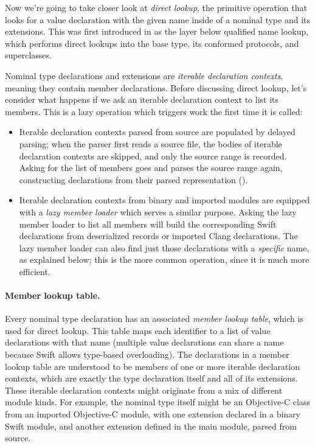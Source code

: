 \documentclass[../generics]{subfiles}
\begin{document}
Now we're going to take closer look at \emph{direct lookup}, the primitive operation that looks for a value declaration with the given name inside of a nominal type and its extensions. This was first introduced in  as the layer below qualified name lookup, which performs direct lookups into the base type, its conformed protocols, and superclasses.

Nominal type declarations and extensions are \emph{iterable declaration contexts}, meaning they contain member declarations. Before discussing direct lookup, let's consider what happens if we ask an iterable declaration context to list its members. This is a lazy operation which triggers work the first time it is called:
\begin{itemize}
\item Iterable declaration contexts parsed from source are populated by delayed parsing; when the parser first reads a source file, the bodies of iterable declaration contexts are skipped, and only the source range is recorded. Asking for the list of members goes and parses the source range again, constructing declarations from their parsed representation ().
\item Iterable declaration contexts from binary and imported modules are equipped with a \emph{lazy member loader} which serves a similar purpose. Asking the lazy member loader to list all members will build the corresponding Swift declarations from deserialized records or imported Clang declarations. The lazy member loader can also find just those declarations with a \emph{specific} name, as explained below; this is the more common operation, since it is much more efficient.
\end{itemize}

\paragraph{Member lookup table.}
Every nominal type declaration has an associated \emph{member lookup table}, which is used for direct lookup. This table maps each identifier to a list of value declarations with that name (multiple value declarations can share a name because Swift allows type-based overloading). The declarations in a member lookup table are understood to be members of one or more iterable declaration contexts, which are exactly the type declaration itself and all of its extensions. These iterable declaration contexts might originate from a mix of different module kinds. For example, the nominal type itself might be an Objective-C class from an imported Objective-C module, with one extension declared in a binary Swift module, and another extension defined in the main module, parsed from source. 
\end{document}
